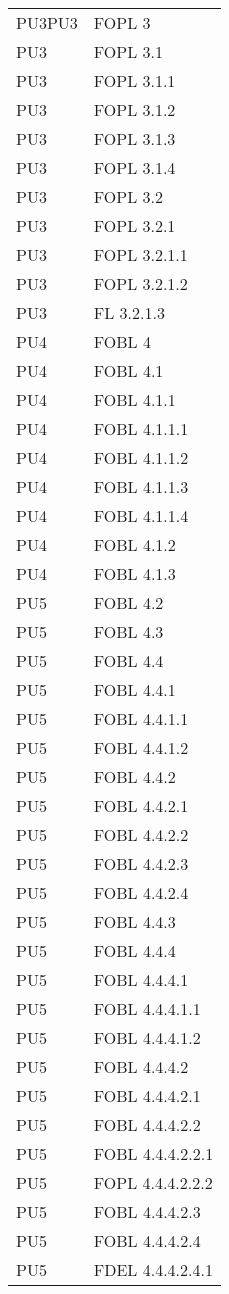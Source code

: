 \begin{longtable}{XX}
\midrule 
PU3PU3&FOPL 3\\ 
PU3&FOPL 3.1\\ 
PU3&FOPL 3.1.1\\ 
PU3&FOPL 3.1.2\\ 
PU3&FOPL 3.1.3\\ 
PU3&FOPL 3.1.4\\ 
PU3&FOPL 3.2\\ 
PU3&FOPL 3.2.1\\ 
PU3&FOPL 3.2.1.1\\ 
PU3&FOPL 3.2.1.2\\ 
PU3&FL 3.2.1.3\\ 
\midrule 
PU4&FOBL 4\\ 
PU4&FOBL 4.1\\ 
PU4&FOBL 4.1.1\\ 
PU4&FOBL 4.1.1.1\\ 
PU4&FOBL 4.1.1.2\\ 
PU4&FOBL 4.1.1.3\\ 
PU4&FOBL 4.1.1.4\\ 
PU4&FOBL 4.1.2\\ 
PU4&FOBL 4.1.3\\ 
\midrule 
PU5&FOBL 4.2\\ 
PU5&FOBL 4.3\\ 
PU5&FOBL 4.4\\ 
PU5&FOBL 4.4.1\\ 
PU5&FOBL 4.4.1.1\\ 
PU5&FOBL 4.4.1.2\\ 
PU5&FOBL 4.4.2\\ 
PU5&FOBL 4.4.2.1\\ 
PU5&FOBL 4.4.2.2\\ 
PU5&FOBL 4.4.2.3\\ 
PU5&FOBL 4.4.2.4\\ 
PU5&FOBL 4.4.3\\ 
PU5&FOBL 4.4.4\\ 
PU5&FOBL 4.4.4.1\\ 
PU5&FOBL 4.4.4.1.1\\ 
PU5&FOBL 4.4.4.1.2\\ 
PU5&FOBL 4.4.4.2\\ 
PU5&FOBL 4.4.4.2.1\\ 
PU5&FOBL 4.4.4.2.2\\ 
PU5&FOBL 4.4.4.2.2.1\\ 
PU5&FOPL 4.4.4.2.2.2\\ 
PU5&FOBL 4.4.4.2.3\\ 
PU5&FOBL 4.4.4.2.4\\ 
PU5&FDEL 4.4.4.2.4.1\\ 

\end{longtable}
